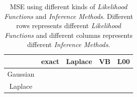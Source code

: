 \begin{table}[h]
\centering
{\small
\begin{tabular}{|c|cccc|}
    \hline
	    & exact & Laplace & VB & L00 \\ 
    \hline
	   Gaussian & & & & \\
	   Laplace & & & & \\
    \hline
\end{tabular}
}
\caption{MSE using different kinds of \emph{Likelihood Functions} and \emph{Inference Methods}. Different rows represents different \emph{Likelihood Functions} and different columns represents different \emph{Inference Methods}. }
\label{tab:predict22}
\end{table}









